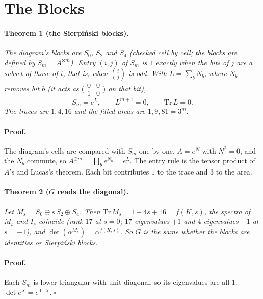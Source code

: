 \documentclass[twocolumn]{iopjournal}
\begin{document}

\section*{The Blocks}

\paragraph{Theorem 1 (the Sierpi\'nski blocks).} \textit{The
diagram's blocks are $S_0$, $S_2$ and $S_4$ (checked cell by cell; the
blocks are defined by $S_m = A^{\otimes m}$). Entry $(i,j)$ of $S_m$
is $1$ exactly when the bits of $j$ are a subset of those of $i$,
that is, when $\binom{i}{j}$ is odd. With $L = \sum_{b} N_b$, where
$N_b$ removes bit $b$ (it acts as
$\bigl(\begin{smallmatrix}0&0\\1&0\end{smallmatrix}\bigr)$ on that
bit),}
\begin{equation}
  S_m = e^{L}, \qquad L^{m+1} = 0, \qquad \mathrm{Tr}\,L = 0 .
\end{equation}
\textit{The traces are $1, 4, 16$ and the filled areas are $1, 9,
81 = 3^m$.}

\paragraph{Proof.} The diagram's cells are compared with $S_m$ one by
one. $A = e^{N}$ with $N^2 = 0$, and the $N_b$ commute, so
$A^{\otimes m} = \prod_b e^{N_b} = e^{L}$. The entry rule is the
tensor product of $A$'s and Lucas's theorem. Each bit contributes
$1$ to the trace and $3$ to the area. \hfill $\square$

\paragraph{Theorem 2 ($G$ reads the diagonal).} \textit{Let
$M_s = S_0 \oplus s\,S_2 \oplus S_4$. Then $\mathrm{Tr}\,M_s =
1 + 4s + 16 = f(K,s)$, the spectra of $M_s$ and $I_s$ coincide (rank
$17$ at $s = 0$; $17$ eigenvalues $+1$ and $4$ eigenvalues $-1$ at
$s = -1$), and $\det(\alpha^{M_s}) = \alpha^{f(K,s)}$. So $G$ is the
same whether the blocks are identities or Sierpi\'nski blocks.}

\paragraph{Proof.} Each $S_m$ is lower triangular with unit
diagonal, so its eigenvalues are all $1$. $\det e^{X} =
e^{\mathrm{Tr}\,X}$. \hfill $\square$
\end{document}
